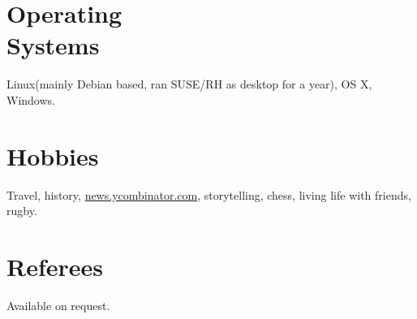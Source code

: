 \documentclass[margin,line]{resume}
\begin{document}
\begin{resume}
    \section{\mysidestyle Operating \\Systems}
    Linux(mainly Debian based, ran SUSE/RH as desktop for a year), OS X, Windows.

    \section{\mysidestyle Hobbies}
    Travel, history, \href{http://news.ycombinator.com}{news.ycombinator.com}, storytelling, chess, living life with friends, rugby.

    \section{\mysidestyle Referees} 
    Available on request.

\end{resume}
\end{document}
